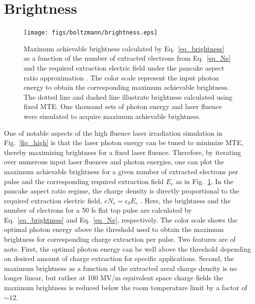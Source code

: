 \section{Brightness}

\begin{figure}
	\centering
	\texttt{[image: figs/boltzmann/brightness.eps]}
	\caption{Maximum achievable brightness calculated by Eq.~\ref{eq_brightness} as a function of the number of extracted electrons from Eq.~\ref{eq_Ne} and the required extraction electric field under the pancake aspect ratio approximation \cite{pancake,rethfeld_schottky}. The color scale represent the input photon energy to obtain the corresponding maximum achievable brightness. The dotted line and dashed line illustrate brightness calculated using fixed MTE. One thousand sets of photon energy and laser fluence were simulated to acquire maximum achievable brightness.}
	\label{fig_brightness}
\end{figure}

One of notable aspects of the high fluence laser irradiation simulation in Fig.~\ref{fig_high} is that the laser photon energy can be tuned to minimize MTE, thereby maximizing brightness for a fixed laser fluence. Therefore, by iterating over numerous input laser fluences and photon energies, one can plot the maximum achievable brightness for a given number of extracted electrons per pulse and the corresponding required extraction field $E_c$ as in Fig.~\ref{fig_brightness}.
In the pancake aspect ratio regime, the charge density is directly proportional to the required extraction electric field, $e N_e = \epsilon_0 E_c$ \cite{pancake,rethfeld_schottky}.
Here, the brightness and the number of electrons for a 50 fs flat top pulse are calculated by Eq.~\ref{eq_brightness} and Eq.~\ref{eq_Ne}, respectively. The color scale shows the optimal photon energy above the threshold used to obtain the maximum brightness for corresponding charge extraction per pulse. Two features are of note. First, the optimal photon energy can be well above the threshold depending on desired amount of charge extraction for specific applications. Second, the maximum brightness as a function of the extracted areal charge density is no longer linear, but rather at 100 MV/m equivalent space charge fields the maximum brightness is reduced below the room temperature limit by a factor of $\sim 12$.




